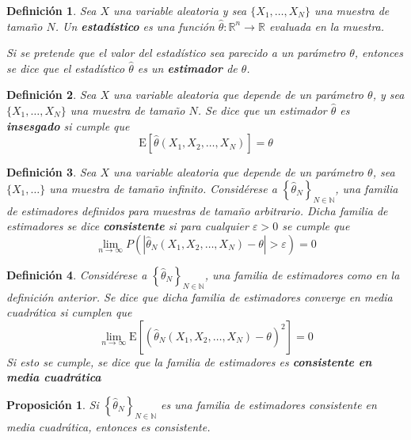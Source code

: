 \documentclass[12pt,letterpaper]{book}
\newtheorem{definicion}{Definición}[chapter]
\newtheorem{proposicion}[teorema]{Proposición}
\newcommand{\R}{\mathbb{R}}
\newcommand{\N}{\mathbb{N}}
\newcommand{\E}[1]{\mathrm{E}\left[ #1 \right]}
\newcommand{\abso}[1]{\left| #1 \right|}
\begin{document}
\begin{definicion}
Sea $X$ una variable aleatoria y sea $\{ X_1, \dots, X_N \}$ una muestra de tamaño $N$.
%
Un \textbf{estadístico} es una función $\widehat{\theta}: \R^{n}\rightarrow\R$ evaluada en la muestra.

Si se pretende que el valor del estadístico sea \textit{parecido} a un parámetro $\theta$, entonces se dice que el estadístico $\widehat{\theta}$ es un \textbf{estimador} de $\theta$.
\end{definicion}

\begin{definicion}
Sea $X$ una variable aleatoria que depende de un parámetro $\theta$, y sea $\{ X_1, \dots, X_N \}$ una muestra de tamaño $N$. Se dice que un estimador $\widehat{\theta}$ es \textbf{insesgado} si cumple que
\begin{equation}
\E{\widehat{\theta}(X_1,X_2,\dots,X_N)} = \theta
\end{equation}
\end{definicion}

\begin{definicion}
Sea $X$ una variable aleatoria que depende de un parámetro $\theta$, sea $\{ X_1, \dots\}$ una muestra de tamaño infinito.
%
Considérese a $\left\{ \widehat{\theta}_N \right\}_{N\in \N}$, una familia de estimadores definidos para muestras de tamaño arbitrario. 
%
Dicha familia de estimadores se dice \textbf{consistente} si para cualquier $\varepsilon > 0$ se cumple que
\begin{equation}
\lim_{n\rightarrow\infty} P\left( \abso{\widehat{\theta}_N(X_1,X_2,\dots,X_N)-\theta} > \varepsilon \right) = 0
\end{equation}
\end{definicion}

\begin{definicion}
Considérese a $\left\{ \widehat{\theta}_N \right\}_{N\in \N}$, una familia de estimadores como en la definición anterior.
%
Se dice que dicha familia de estimadores \textit{converge en media cuadrática} si cumplen que
\begin{equation}
\lim_{n\rightarrow\infty} \E{\left( \widehat{\theta}_N(X_1,X_2,\dots,X_N) - \theta \right)^{2}} = 0
\end{equation}
Si esto se cumple, se dice que la familia de estimadores es \textbf{consistente en media cuadrática} \end{definicion}

\begin{proposicion}
Si $\left\{ \widehat{\theta}_N \right\}_{N\in \N}$ es una familia de estimadores consistente en media cuadrática, entonces es consistente.
\end{proposicion}
\end{document}
